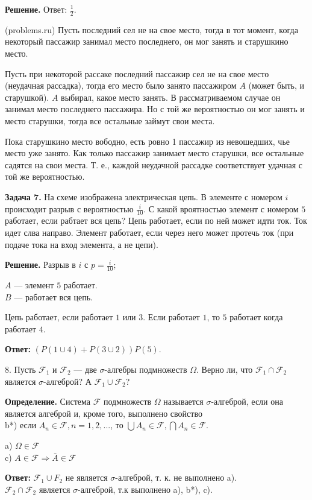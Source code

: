 \documentclass{article}
\begin{document}
\textbf{Решение.}
Ответ: $\frac{1}{2}$.

(problems.ru)
Пусть последний сел не на свое место, тогда в тот момент, когда некоторый пассажир занимал место последнего, он мог занять и старушкино место. 

Пусть при некоторой рассаке последний пассажир сел не на свое место (неудачная рассадка), тогда его место было занято пассажиром $A$ (может быть, и старушкой). $A$ выбирал, какое место занять. В рассматриваемом случае он занимал место последнего пассажира. Но с той же вероятностью он мог занять и место старушки, тогда все остальные займут свои места. 

Пока старушкино место вободно, есть ровно 1 пассажир из невошедших, чье место уже занято. Как только пассажир занимает место старушки, все остальные садятся на свои места. Т. е., каждой неудачной рассадке соответствует удачная с той же вероятностью. 


\textbf{Задача 7.}
На схеме изображена электрическая цепь. В элементе с номером $i$ происходит разрыв с вероятностью $\frac{i}{10}$. 
С какой вроятностью элемент с номером $5$ работает, если рабтает вся цепь? 
Цепь работает, если по ней может идти ток. 
Ток идет слва направо. 
Элемент работает, если через него может протечь ток (при подаче тока на вход элемента, а не цепи). 

\textbf{Решение.}
Разрыв в $i$ с $p=\frac{i}{10}$;

$A$ --- элемент $5$ работает.\\
$B$ --- работает вся цепь. 

Цепь работает, если работает $1$ или $3$.
Если работает $1$, то $5$ работает когда работает $4$.

\textbf{Ответ:} $(P(1\cup4)+P(3\cup2))P(5)$.


8. Пусть $\mathcal{F}_1$ и $\mathcal{F}_2$ --- две $\sigma$-алгебры подмножеств $\Omega$. Верно ли, что $\mathcal{F}_1\cap\mathcal{F}_2$ является $\sigma$-алгеброй? А $\mathcal{F}_1\cup\mathcal{F}_2$?

\textbf{Определение.}
Система $\mathscr F$ подмножеств $\Omega$ называется $\sigma$-алгеброй, если она является алгеброй и, кроме того, выполнено свойство \\
b*) если $A_n\in\mathscr F, n=1,2,...$, то $\bigcup A_n\in\mathscr F, \bigcap A_n\in\mathscr F$.

a) $\Omega\in\mathscr F$\\
c) $A\in\mathscr F\Rightarrow \bar A\in\mathscr F$

\textbf{Ответ:}
$\mathscr F_1\cup F_2$ не является $\sigma$-алгеброй, т. к. не выполнено a).\\
$\mathscr F_2\cap\mathscr F_2$ является $\sigma$-алгеброй, т.к выполнено a), b*), c).
\end{document}
